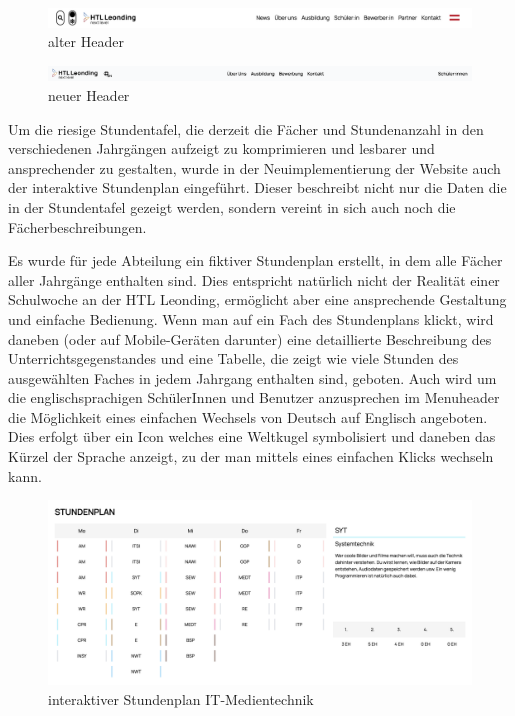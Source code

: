 \begin{figure}
      \centering
      \includegraphics[scale=0.3]{pics/header_alt.png}
      \caption{alter Header}
      \label{fig:impl:header:alt}
  \end{figure}

  \begin{figure}
   \centering
   \includegraphics[scale=0.3]{pics/header_neu.png}
   \caption{neuer Header}
   \label{fig:impl:header:neu}
\end{figure}

Um die riesige Stundentafel, die derzeit die Fächer und Stundenanzahl in den verschiedenen Jahrgängen aufzeigt zu komprimieren und 
lesbarer und ansprechender zu gestalten, wurde in der Neuimplementierung der Website auch der interaktive Stundenplan eingeführt. Dieser beschreibt nicht nur
die Daten die in der Stundentafel gezeigt werden, sondern vereint in sich auch noch die Fächerbeschreibungen. 

Es wurde für jede Abteilung ein fiktiver Stundenplan erstellt, in dem alle Fächer aller Jahrgänge enthalten sind. Dies entspricht natürlich nicht 
der Realität einer Schulwoche an der HTL Leonding, ermöglicht aber eine ansprechende Gestaltung und einfache Bedienung. Wenn man auf ein Fach des Stundenplans klickt,
wird daneben (oder auf Mobile-Geräten darunter) eine detaillierte Beschreibung des Unterrichtsgegenstandes und eine Tabelle, die zeigt wie viele
Stunden des ausgewählten Faches in jedem Jahrgang enthalten sind, geboten. 
Auch wird um die englischsprachigen SchülerInnen und Benutzer anzusprechen im Menuheader die Möglichkeit eines einfachen
Wechsels von Deutsch auf Englisch angeboten. Dies erfolgt über ein Icon welches eine Weltkugel symbolisiert und daneben das Kürzel der
Sprache anzeigt, zu der man mittels eines einfachen Klicks wechseln kann. 


\begin{figure}
   \begin{minipage}[b]{\linewidth} 
      \includegraphics[scale=0.3]{pics/interaktiver-stundenplan.png}
      \caption{interaktiver Stundenplan IT-Medientechnik}
      \label{fig:impl:interaktiver-stundenplan}
   \end{minipage}
   \hspace{.05\linewidth}
\end{figure}

